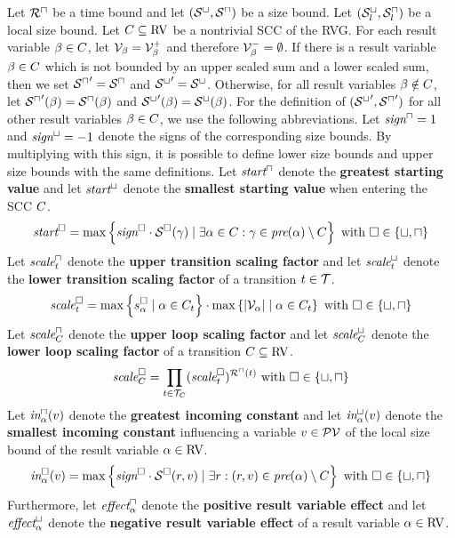 \begin{theorem}
  Let ${\mathcal{R}^\sqcap}$ be a time bound and let ${({\mathcal{S}^\sqcup}, {\mathcal{S}^\sqcap})}$ be a size bound.
  Let ${({\mathcal{S}^\sqcup_l}, {\mathcal{S}^\sqcap_l})}$ be a local size bound.
  Let $C \subseteq \text{RV}$ be a nontrivial SCC of the RVG.
  For each result variable $\beta \in C$, let $\mathcal{V}_\beta = \mathcal{V}^+_\beta$ and therefore $\mathcal{V}^-_\beta = \emptyset$.
  If there is a result variable $\beta \in C$ which is not bounded by an upper scaled sum and a lower scaled sum, then we set ${\mathcal{S}^\sqcap}' = {\mathcal{S}^\sqcap}$ and ${\mathcal{S}^\sqcup}' = {\mathcal{S}^\sqcup}$.
  Otherwise, for all result variables $\beta \notin C$, let ${\mathcal{S}^\sqcap}'(\beta) = {\mathcal{S}^\sqcap}(\beta)$ and ${\mathcal{S}^\sqcup}'(\beta) = {\mathcal{S}^\sqcup}(\beta)$.
  For the definition of $({\mathcal{S}^\sqcup}', {\mathcal{S}^\sqcap}')$ for all other result variables $\beta \in C$, we use the following abbreviations.
  Let $\emph{sign}^\sqcap = 1$ and $\emph{sign}^\sqcup = -1$ denote the signs of the corresponding size bounds.
  By multiplying with this sign, it is possible to define lower size bounds and upper size bounds with the same definitions.
  Let $\emph{start}^\sqcap$ denote the \textbf{greatest starting value} and let $\emph{start}^\sqcup$ denote the \textbf{smallest starting value} when entering the SCC $C$.
  \[ \emph{start}^\square = \max \left\lbrace \emph{sign}^\square \cdot {\mathcal{S}^\square}(\gamma) \mid \exists \alpha \in C: \gamma \in \emph{pre}(\alpha) \setminus C \right\rbrace \text{ with } \square \in \lbrace \sqcup, \sqcap \rbrace \]
  Let $\emph{scale}^\sqcap_t$ denote the \textbf{upper transition scaling factor} and let $\emph{scale}^\sqcup_t$ denote the \textbf{lower transition scaling factor} of a transition $t \in \mathcal{T}$.
  \[ \emph{scale}^\square_t = \max \left\lbrace s^\square_\alpha \mid \alpha \in C_t \right\rbrace \cdot \max \left\lbrace \left|\mathcal{V}_\alpha\right| \mid \alpha \in C_t \right\rbrace \text{ with } \square \in \lbrace \sqcup, \sqcap \rbrace \]
  Let $\emph{scale}^\sqcap_C$ denote the \textbf{upper loop scaling factor} and let $\emph{scale}^\sqcup_C$ denote the \textbf{lower loop scaling factor} of a transition $C \subseteq \text{RV}$.
  \[ \emph{scale}^\square_C = \prod_{t \in \mathcal{T}_C} (\emph{scale}^\square_t)^{{\mathcal{R}^\sqcap}(t)} \text{ with } \square \in \lbrace \sqcup, \sqcap \rbrace \]
  Let $\emph{in}^\sqcap_\alpha(v)$ denote the \textbf{greatest incoming constant} and let $\emph{in}^\sqcup_\alpha(v)$ denote the \textbf{smallest incoming constant} influencing a variable $v \in \mathcal{PV}$ of the local size bound of the result variable $\alpha \in \text{RV}$.
  \[ \emph{in}^\square_\alpha(v) = \max \left\lbrace \emph{sign}^\square \cdot {\mathcal{S}^\square}(r, v) \mid \exists r: (r, v) \in \emph{pre}(\alpha) \setminus C \right\rbrace \text{ with } \square \in \lbrace \sqcup, \sqcap \rbrace \]
  Furthermore, let $\emph{effect}^\sqcap_\alpha$ denote the \textbf{positive result variable effect} and let $\emph{effect}^\sqcup_\alpha$ denote the \textbf{negative result variable effect} of a result variable $\alpha \in \text{RV}$.

\end{theorem}
